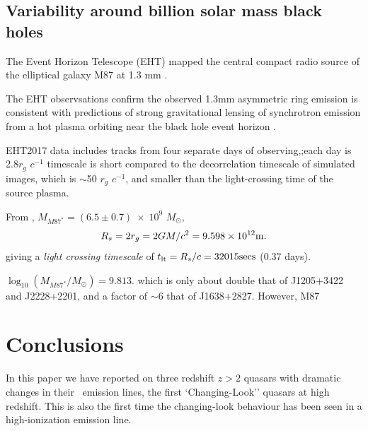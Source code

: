 \documentclass[a4paper,fleqn,usenatbib]{mnras}
\begin{document}
\subsection{Variability around billion solar mass black holes} 
The Event Horizon Telescope (EHT) mapped the central compact radio
source of the elliptical galaxy M87 at 1.3 mm \citep{EHT2019_PaperI, EHT2019_PaperII, EHT2019_PaperIII, EHT2019_PaperIV, EHT2019_PaperV, EHT2019_PaperVI} .

The EHT observsations confirm the observed 1.3mm asymmetric ring
emission is consistent with predictions of strong
gravitational lensing of synchrotron emission from a hot plasma
orbiting near the black hole event horizon \citep{EHT2019_PaperV}. 

EHT2017 data includes tracks from four separate
days of observing,;each day is 2.8$r_{g}$ $c^{-1}$ \citep{(EHT_PaperIV} timescale is short
compared to the decorrelation timescale of simulated images, which is
$\sim$50 $r_{g}$ $c^{-1}$, and smaller than the light-crossing time of the source
plasma.

From \citet{EHT_PaperI}, $M_{M87^{*}} = (6.5\pm0.7) \; \times \; 10^{9}$ $M_{\odot}$, 
\begin{equation}
R_{s} = 2 r_{g} =  2 GM/c^{2}  = 9.598 \times10^{12} {\rm m}.
\end{equation}
giving a {\it light crossing timescale} of $t_{\rm lt} = R_{s} / c = 32 015 {\rm secs}$ (0.37 days).

$\log_{10} (M_{M87^{*}} / M_{\odot} ) = 9.813$. 
which is only about double that of J1205+3422 and J2228+2201,
and a factor of $\sim$6 that of J1638+2827.
However, M87 

\section{Conclusions}
In this paper we have reported on three redshift $z>2$ quasars with
dramatic changes in their \civ\ emission lines, the first
`Changing-Look'' quasars at high redshift.  This is also the first
time the changing-look behaviour has been seen in a high-ionization
emission line.
\end{document}
